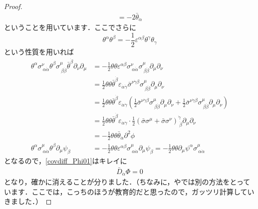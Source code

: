 \documentclass[a4paper,uplatex,dvipdfmx]{jsarticle}
\theoremstyle{definition}
\begin{document}
\begin{proof}
\begin{align}
    =
    -2\bar{\theta}_{\dot{\alpha}}    
    \label{formula03}
  \end{align}
  ということを用いています．ここでさらに
  \begin{equation}
    \theta^{\alpha}\theta^{\beta}
    =
    -
    \frac{1}{2}\varepsilon^{\alpha\beta}\theta^{\gamma}\theta_{\gamma}
    \label{formula04}
  \end{equation}
  という性質を用いれば
  \begin{align}
    \theta^{\alpha}
    \sigma^{\nu}_{\ \alpha\dot{\alpha}}
    \theta^{\beta}
    \sigma^{\mu}_{\ \beta\dot{\beta}}
    \bar{\theta}^{\dot{\beta}}
    \partial_{\nu}\partial_{\mu}
    &=
    -
    \frac{1}{2}\theta\theta
    \varepsilon^{\alpha\beta}
    \sigma^{\nu}_{\ \alpha\dot{\alpha}}
    \sigma^{\mu}_{\ \beta\dot{\beta}}
    \partial_{\mu}\partial_{\nu}
    \nonumber
    \\
    &=
    \frac{1}{2}\theta\theta\bar{\theta}^{\dot{\beta}}
    \varepsilon_{\dot{\alpha}\dot{\gamma}}
    \bar{\sigma}^{\nu\dot{\gamma}\beta}
    \sigma^{\mu}_{\ \beta\dot{\beta}}
    \partial_{\mu}\partial_{\nu}
    \nonumber
    \\
    &=
    \frac{1}{2}\theta\theta\bar{\theta}^{\dot{\beta}}
    \varepsilon_{\dot{\alpha}\dot{\gamma}}
    \left(  
      \frac{1}{2}
      \bar{\sigma}^{\nu\dot{\gamma}\beta}
      \sigma^{\mu}_{\ \beta\dot{\beta}}
      \partial_{\mu}\partial_{\nu}
      +
      \frac{1}{2}
      \bar{\sigma}^{\nu\dot{\gamma}\beta}
      \sigma^{\mu}_{\ \beta\dot{\beta}}
      \partial_{\mu}\partial_{\nu}
    \right)
    \nonumber
    \\
    &=
    \frac{1}{2}\theta\theta\bar{\theta}^{\dot{\beta}}
    \varepsilon_{\dot{\alpha}\dot{\gamma}}
    \cdot\frac{1}{2}
    \left(        
      \bar{\sigma}
      \sigma^{\mu}
      +
      \bar{\sigma}
      \sigma^{\nu}
    \right)^{\dot{\gamma}}_{\ \dot{\beta}}
    \partial_{\mu}\partial_{\nu}
    \nonumber
    \\
    &=
    -\frac{1}{2}\theta\theta\bar{\theta}_{\dot{\alpha}}\partial^{2}\phi
    \\
    \theta^{\alpha}\sigma^{\mu}_{\ \alpha\dot{\alpha}}\theta^{\beta}\partial_{\mu}\psi_{\beta}
    &=
    -
    \frac{1}{2}\theta\theta\varepsilon^{\alpha\beta}\sigma^{\mu}_{\ \alpha\dot{\alpha}}\partial_{\mu}\psi_{\beta}
    =
    -
    \frac{1}{2}\theta\theta\partial_{\mu}\psi^{\alpha}\sigma^{\mu}_{\ \alpha\dot{\alpha}}
  \end{align}
  となるので，\eqref{covdiff_Phi01}はキレイに
  \begin{align}
    \bar{D}_{\dot{\alpha}}\Phi
    =
    0
  \end{align}
  となり，確かに消えることが分りました．（ちなみに，\cite{Wess_SupersymmetrySupergravity_1992}や\cite{Bilal_IntroductionSupersymmetry_2001}では別の方法をとっています．ここでは，こっちのほうが教育的だと思ったので，ガッツリ計算していきました．）
\end{proof}
\end{document}
